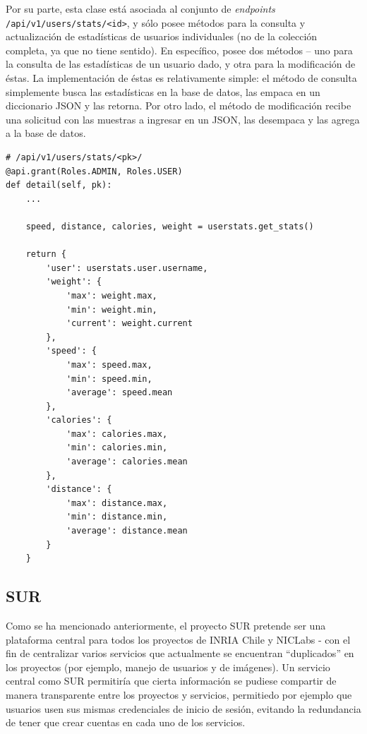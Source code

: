 \documentclass[11pt,letterpaper]{article}
\begin{document}
Por su parte, esta clase está asociada al conjunto de \emph{endpoints} \texttt{/api/v1/users/stats/\textless id\textgreater}, y sólo posee métodos para la consulta y actualización de estadísticas de usuarios individuales (no de la colección completa, ya que no tiene sentido). En específico, posee dos métodos -- uno para la consulta de las estadísticas de un usuario dado, y otra para la modificación de éstas. La implementación de éstas es relativamente simple: el método de consulta simplemente busca las estadísticas en la base de datos, las empaca en un diccionario JSON y las retorna. Por otro lado, el método de modificación recibe una solicitud con las muestras a ingresar en un JSON, las desempaca y las agrega a la base de datos.\\

\begin{lstlisting}[title=Extracto del método de consulta de estadísticas de usuario.]
# /api/v1/users/stats/<pk>/
@api.grant(Roles.ADMIN, Roles.USER)
def detail(self, pk):
    ...

    speed, distance, calories, weight = userstats.get_stats()

    return {
        'user': userstats.user.username,
        'weight': {
            'max': weight.max,
            'min': weight.min,
            'current': weight.current
        },
        'speed': {
            'max': speed.max,
            'min': speed.min,
            'average': speed.mean
        },
        'calories': {
            'max': calories.max,
            'min': calories.min,
            'average': calories.mean
        },
        'distance': {
            'max': distance.max,
            'min': distance.min,
            'average': distance.mean
        }
    }
\end{lstlisting}

\newpage
\subsection{SUR}

Como se ha mencionado anteriormente, el proyecto SUR pretende ser una plataforma central para todos los proyectos de INRIA Chile y NICLabs - con el fin de centralizar varios servicios que actualmente se encuentran ``duplicados'' en los proyectos (por ejemplo, manejo de usuarios y de imágenes). Un servicio central como SUR permitiría que cierta información se pudiese compartir de manera transparente entre los proyectos y servicios, permitiedo por ejemplo que usuarios usen sus mismas credenciales de inicio de sesión, evitando la redundancia de tener que crear cuentas en cada uno de los servicios.\\
\end{document}
